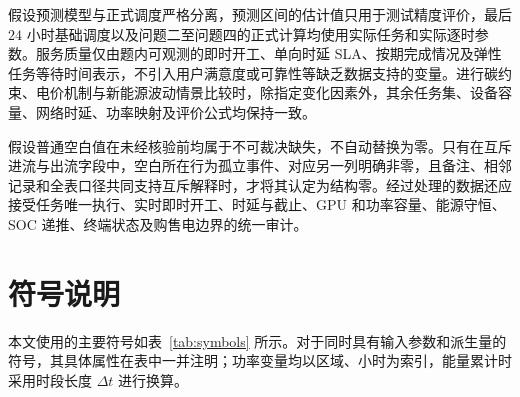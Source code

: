 \documentclass[withoutpreface,bwprint]{cumcmthesis}
\begin{document}
假设预测模型与正式调度严格分离，预测区间的估计值只用于测试精度评价，最后 $24$ 小时基础调度以及问题二至问题四的正式计算均使用实际任务和实际逐时参数。服务质量仅由题内可观测的即时开工、单向时延 SLA、按期完成情况及弹性任务等待时间表示，不引入用户满意度或可靠性等缺乏数据支持的变量。进行碳约束、电价机制与新能源波动情景比较时，除指定变化因素外，其余任务集、设备容量、网络时延、功率映射及评价公式均保持一致。

假设普通空白值在未经核验前均属于不可裁决缺失，不自动替换为零。只有在互斥进流与出流字段中，空白所在行为孤立事件、对应另一列明确非零，且备注、相邻记录和全表口径共同支持互斥解释时，才将其认定为结构零。经过处理的数据还应接受任务唯一执行、实时即时开工、时延与截止、GPU 和功率容量、能源守恒、SOC 递推、终端状态及购售电边界的统一审计。

\section{符号说明}

本文使用的主要符号如表~\ref{tab:symbols} 所示。对于同时具有输入参数和派生量的符号，其具体属性在表中一并注明；功率变量均以区域、小时为索引，能量累计时采用时段长度 $\Delta t$ 进行换算。
\end{document}
